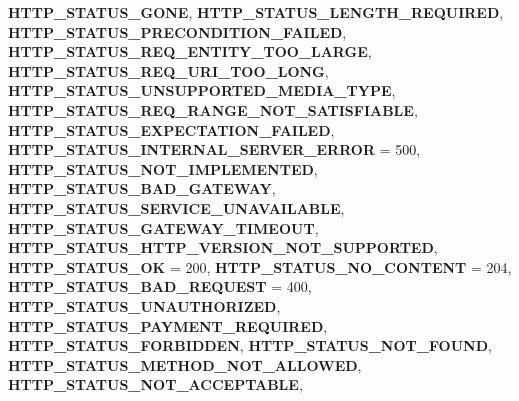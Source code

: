 \begin{DoxyCompactItemize}
\newline
{\bfseries H\+T\+T\+P\+\_\+\+S\+T\+A\+T\+U\+S\+\_\+\+G\+O\+NE}, 
{\bfseries H\+T\+T\+P\+\_\+\+S\+T\+A\+T\+U\+S\+\_\+\+L\+E\+N\+G\+T\+H\+\_\+\+R\+E\+Q\+U\+I\+R\+ED}, 
{\bfseries H\+T\+T\+P\+\_\+\+S\+T\+A\+T\+U\+S\+\_\+\+P\+R\+E\+C\+O\+N\+D\+I\+T\+I\+O\+N\+\_\+\+F\+A\+I\+L\+ED}, 
{\bfseries H\+T\+T\+P\+\_\+\+S\+T\+A\+T\+U\+S\+\_\+\+R\+E\+Q\+\_\+\+E\+N\+T\+I\+T\+Y\+\_\+\+T\+O\+O\+\_\+\+L\+A\+R\+GE}, 
\newline
{\bfseries H\+T\+T\+P\+\_\+\+S\+T\+A\+T\+U\+S\+\_\+\+R\+E\+Q\+\_\+\+U\+R\+I\+\_\+\+T\+O\+O\+\_\+\+L\+O\+NG}, 
{\bfseries H\+T\+T\+P\+\_\+\+S\+T\+A\+T\+U\+S\+\_\+\+U\+N\+S\+U\+P\+P\+O\+R\+T\+E\+D\+\_\+\+M\+E\+D\+I\+A\+\_\+\+T\+Y\+PE}, 
{\bfseries H\+T\+T\+P\+\_\+\+S\+T\+A\+T\+U\+S\+\_\+\+R\+E\+Q\+\_\+\+R\+A\+N\+G\+E\+\_\+\+N\+O\+T\+\_\+\+S\+A\+T\+I\+S\+F\+I\+A\+B\+LE}, 
{\bfseries H\+T\+T\+P\+\_\+\+S\+T\+A\+T\+U\+S\+\_\+\+E\+X\+P\+E\+C\+T\+A\+T\+I\+O\+N\+\_\+\+F\+A\+I\+L\+ED}, 
\newline
{\bfseries H\+T\+T\+P\+\_\+\+S\+T\+A\+T\+U\+S\+\_\+\+I\+N\+T\+E\+R\+N\+A\+L\+\_\+\+S\+E\+R\+V\+E\+R\+\_\+\+E\+R\+R\+OR} = 500, 
{\bfseries H\+T\+T\+P\+\_\+\+S\+T\+A\+T\+U\+S\+\_\+\+N\+O\+T\+\_\+\+I\+M\+P\+L\+E\+M\+E\+N\+T\+ED}, 
{\bfseries H\+T\+T\+P\+\_\+\+S\+T\+A\+T\+U\+S\+\_\+\+B\+A\+D\+\_\+\+G\+A\+T\+E\+W\+AY}, 
{\bfseries H\+T\+T\+P\+\_\+\+S\+T\+A\+T\+U\+S\+\_\+\+S\+E\+R\+V\+I\+C\+E\+\_\+\+U\+N\+A\+V\+A\+I\+L\+A\+B\+LE}, 
\newline
{\bfseries H\+T\+T\+P\+\_\+\+S\+T\+A\+T\+U\+S\+\_\+\+G\+A\+T\+E\+W\+A\+Y\+\_\+\+T\+I\+M\+E\+O\+UT}, 
{\bfseries H\+T\+T\+P\+\_\+\+S\+T\+A\+T\+U\+S\+\_\+\+H\+T\+T\+P\+\_\+\+V\+E\+R\+S\+I\+O\+N\+\_\+\+N\+O\+T\+\_\+\+S\+U\+P\+P\+O\+R\+T\+ED}, 
{\bfseries H\+T\+T\+P\+\_\+\+S\+T\+A\+T\+U\+S\+\_\+\+OK} = 200, 
{\bfseries H\+T\+T\+P\+\_\+\+S\+T\+A\+T\+U\+S\+\_\+\+N\+O\+\_\+\+C\+O\+N\+T\+E\+NT} = 204, 
\newline
{\bfseries H\+T\+T\+P\+\_\+\+S\+T\+A\+T\+U\+S\+\_\+\+B\+A\+D\+\_\+\+R\+E\+Q\+U\+E\+ST} = 400, 
{\bfseries H\+T\+T\+P\+\_\+\+S\+T\+A\+T\+U\+S\+\_\+\+U\+N\+A\+U\+T\+H\+O\+R\+I\+Z\+ED}, 
{\bfseries H\+T\+T\+P\+\_\+\+S\+T\+A\+T\+U\+S\+\_\+\+P\+A\+Y\+M\+E\+N\+T\+\_\+\+R\+E\+Q\+U\+I\+R\+ED}, 
{\bfseries H\+T\+T\+P\+\_\+\+S\+T\+A\+T\+U\+S\+\_\+\+F\+O\+R\+B\+I\+D\+D\+EN}, 
\newline
{\bfseries H\+T\+T\+P\+\_\+\+S\+T\+A\+T\+U\+S\+\_\+\+N\+O\+T\+\_\+\+F\+O\+U\+ND}, 
{\bfseries H\+T\+T\+P\+\_\+\+S\+T\+A\+T\+U\+S\+\_\+\+M\+E\+T\+H\+O\+D\+\_\+\+N\+O\+T\+\_\+\+A\+L\+L\+O\+W\+ED}, 
{\bfseries H\+T\+T\+P\+\_\+\+S\+T\+A\+T\+U\+S\+\_\+\+N\+O\+T\+\_\+\+A\+C\+C\+E\+P\+T\+A\+B\+LE}, 

\end{DoxyCompactItemize}
